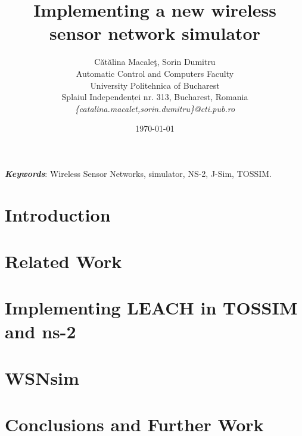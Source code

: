 \documentclass[12pt]{article}
\title{Implementing a new wireless sensor network simulator}
\author{C\u{a}t\u{a}lina Macale\c{t}, Sorin Dumitru\\
Automatic Control and Computers Faculty\\
University Politehnica of Bucharest\\
Splaiul Independenței nr. 313, Bucharest, Romania \\
\emph{\{catalina.macalet,sorin.dumitru\}@cti.pub.ro}}
\date{\today}
\newcommand{\codename}{WSNsim }
\begin{document}
\nocite{*}
\maketitle

\begin{abstract}

\end{abstract}

\textit{\textbf{Keywords}}: Wireless Sensor Networks, simulator, NS-2, J-Sim, TOSSIM.

\section{Introduction}
\label{sec:introduction}


\section{Related Work}
\label{sec:relatedwork}


\section{Implementing LEACH in TOSSIM and ns-2}
\label{sec:tests}


\section{\codename}
\label{sec:simulator}


\section{Conclusions and Further Work}
\label{sec:conclusion}

\newpage


\end{document}
